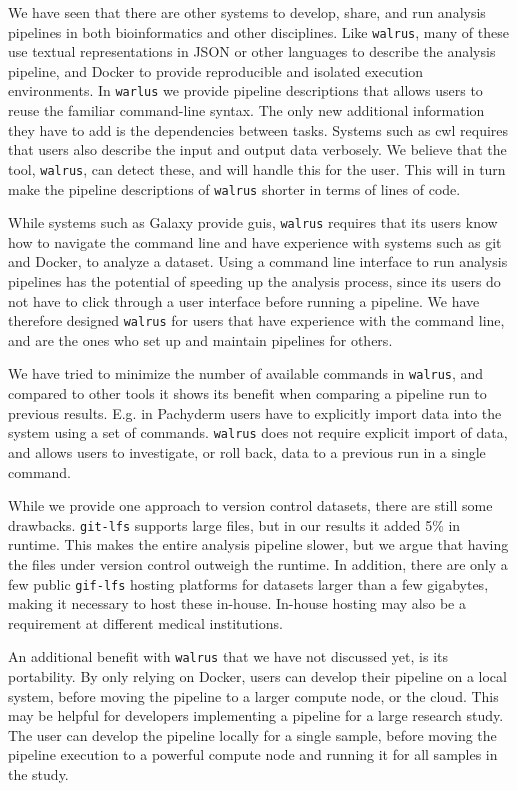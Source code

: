 We have seen that there are other systems to develop, share, and run
analysis pipelines in both bioinformatics and other disciplines. Like
\texttt{walrus}, many of these use textual representations in JSON or other
languages to describe the analysis pipeline, and Docker to provide reproducible
and isolated execution environments. In \texttt{warlus} we provide pipeline
descriptions that allows users to reuse the familiar command-line syntax. The
only new additional information they have to add is the dependencies between
tasks. Systems such as \gls{cwl} requires that users also describe the input and
output data verbosely. We believe that the tool, \texttt{walrus}, can detect
these, and will handle this for the user. This will in turn make the pipeline
descriptions of \texttt{walrus} shorter in terms of lines of code.  

While systems such as Galaxy provide \glspl{gui}, \texttt{walrus}
requires that its users know how to navigate the command line and have experience
with systems such as git and Docker, to analyze a dataset. Using a command line
interface to run analysis pipelines has the potential of speeding up the
analysis process, since its users do not have to click through a user interface
before running a pipeline. We have therefore designed \texttt{walrus} for users
that have experience with the command line, and are the ones who set up and
maintain pipelines for others. 

We have tried to minimize the number of available commands in \texttt{walrus},
and compared to other tools it shows its benefit when comparing a pipeline run
to previous results. E.g. in Pachyderm users have to explicitly import data into
the system using a set of commands. \texttt{walrus} does not require explicit
import of data, and allows users to investigate, or roll back, data to a
previous run in a single command.

While we provide one approach to version control datasets, there are still some
drawbacks. \texttt{git-lfs} supports large files, but in our results it added
5\% in runtime.  This makes the entire analysis pipeline slower, but we argue
that having the files under version control outweigh the runtime. In addition,
there are only a few public \texttt{gif-lfs} hosting platforms for datasets
larger than a few gigabytes, making it necessary to host these in-house.
In-house hosting may also be a requirement at different medical institutions.  

An additional benefit with \texttt{walrus} that we have not discussed yet, is
its portability. By only relying on Docker, users can develop their pipeline on
a local system, before moving the pipeline to a larger compute node, or the
cloud. This may be helpful for developers implementing a pipeline for a large
research study. The user can develop the pipeline locally for a single
sample, before moving the pipeline execution to a powerful compute node and
running it for all samples in the study.  


